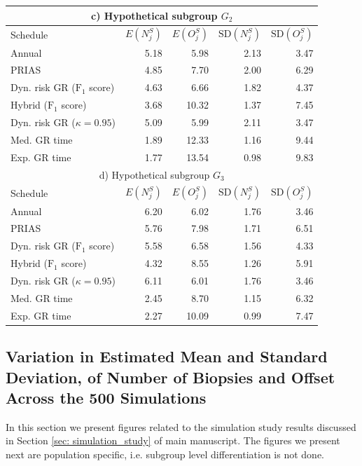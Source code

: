 \begin{table}[!htb]
\begin{tabular}{lrrrr}
\hline      
\multicolumn{5}{c}{c) Hypothetical subgroup $G_2$}\\
\hline
Schedule        & $E(N^S_j)$ & $E(O^S_j)$ & ${\mbox{SD}(N^S_j)}$ & ${\mbox{SD}(O^S_j)}$ \\
\hline
Annual         & 5.18            & 5.98                & 2.13          & 3.47              \\
PRIAS          & 4.85            & 7.70                & 2.00          & 6.29        \\
Dyn. risk GR ($\mbox{F}_1$ score)       & 4.63            & 6.66                & 1.82          & 4.37              \\
Hybrid ($\mbox{F}_1$ score)       & 3.68            & 10.32                & 1.37          & 7.45              \\
Dyn. risk GR ($\kappa=0.95$) & 5.09 & 5.99 & 2.11 & 3.47\\
Med. GR time & 1.89             & 12.33               & 1.16          & 9.44              \\
Exp. GR time & 1.77            & 13.54               & 0.98          & 9.83              \\
\hline      
\multicolumn{5}{c}{d) Hypothetical subgroup $G_3$}\\
\hline
Schedule        & $E(N^S_j)$ & $E(O^S_j)$ & ${\mbox{SD}(N^S_j)}$ & ${\mbox{SD}(O^S_j)}$ \\
\hline
Annual         & 6.20             & 6.02                & 1.76          & 3.46              \\
PRIAS          & 5.76             & 7.98                & 1.71         & 6.51        \\
Dyn. risk GR ($\mbox{F}_1$ score)       & 5.58            & 6.58                & 1.56          & 4.33              \\
Hybrid ($\mbox{F}_1$ score)       & 4.32            & 8.55                & 1.26          & 5.91              \\
Dyn. risk GR ($\kappa=0.95$) & 6.11 & 6.01 & 1.76 & 3.46\\
Med. GR time & 2.45            & 8.70                & 1.15          & 6.32              \\
Exp. GR time & 2.27            & 10.09               & 0.99          & 7.47              \\
\hline     
\end{tabular}
\end{table}

\clearpage

\subsection{Variation in Estimated Mean and Standard Deviation, of Number of Biopsies and Offset Across the 500 Simulations}
In this section we present figures related to the simulation study results discussed in Section \ref{sec: simulation_study} of main manuscript. The figures we present next are population specific, i.e. subgroup level differentiation is not done.

